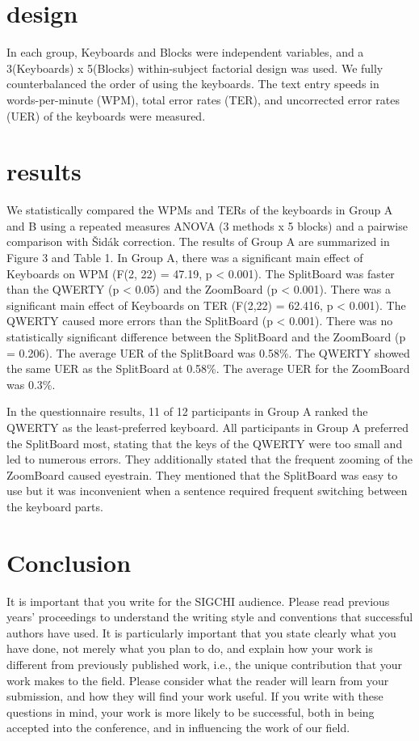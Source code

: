 \documentclass{sigchi}
\begin{document}
\section{design}
In each group, Keyboards and Blocks were independent variables, and a 3(Keyboards) x 5(Blocks) within-subject factorial design was used. We fully counterbalanced the order of using the keyboards. The text entry speeds in words-per-minute (WPM), total error rates (TER), and uncorrected error rates (UER) of the keyboards were measured.

\section{results}
We statistically compared the WPMs and TERs of the keyboards in Group A and B using a repeated measures ANOVA (3 methods x 5 blocks) and a pairwise comparison with Šidák correction. The results of Group A are summarized in Figure 3 and Table 1. In Group A, there was a significant main effect of Keyboards on WPM (F(2, 22) = 47.19, p < 0.001). The SplitBoard was faster than the QWERTY (p < 0.05) and the ZoomBoard (p < 0.001). There was a significant main effect of Keyboards on TER (F(2,22) = 62.416, p < 0.001). The QWERTY caused more errors than the SplitBoard (p < 0.001). There was no statistically significant difference between the SplitBoard and the ZoomBoard (p = 0.206). The average UER of the SplitBoard was 0.58\%. The QWERTY showed the same UER as the SplitBoard at 0.58\%. The average UER for the ZoomBoard was 0.3\%.

In the questionnaire results, 11 of 12 participants in Group A ranked the QWERTY as the least-preferred keyboard. All participants in Group A preferred the SplitBoard most, stating that the keys of the QWERTY were too small and led to numerous errors. They additionally stated that the      
frequent zooming of the ZoomBoard caused eyestrain. They mentioned that the SplitBoard was easy to use but it was inconvenient when a sentence required frequent switching between the keyboard parts.


\section{Conclusion}

It is important that you write for the SIGCHI audience. Please read
previous years' proceedings to understand the writing style and
conventions that successful authors have used. It is particularly
important that you state clearly what you have done, not merely what
you plan to do, and explain how your work is different from previously
published work, i.e., the unique contribution that your work makes to
the field. Please consider what the reader will learn from your
submission, and how they will find your work useful. If you write with
these questions in mind, your work is more likely to be successful,
both in being accepted into the conference, and in influencing the
work of our field.
\end{document}
